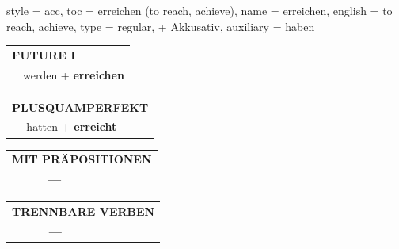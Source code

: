 \begin{verbentry}{
  style = {acc},
  toc = {erreichen (to reach, achieve)},
  name = {erreichen},
  english = {to reach, achieve},
  type = {regular, + Akkusativ},
  auxiliary = {haben}
}
\begin{tabular}{rl}
    \multicolumn{2}{l}{\textbf{FUTURE I} }\\
  &  werden + \textbf{erreichen}\\
 
  \end{tabular}
\hfill
   \begin{tabular}{rl}
      \multicolumn{2}{l}{\textbf{PLUSQUAMPERFEKT}}\\
  &  hatten + \textbf{erreicht}\\
  \end{tabular}
  
  
\vspace{10pt}

\begin{tabular}{lll}
\multicolumn{3}{l}{\textbf{MIT PRÄPOSITIONEN}}\\
& \textbf{---} & \\
\end{tabular}
\hfill
\begin{tabular}{lll}
\multicolumn{3}{l}{\textbf{TRENNBARE VERBEN}}\\
& \textbf{---} & \\
\end{tabular}
\vspace{-5pt}
\end{verbentry}

